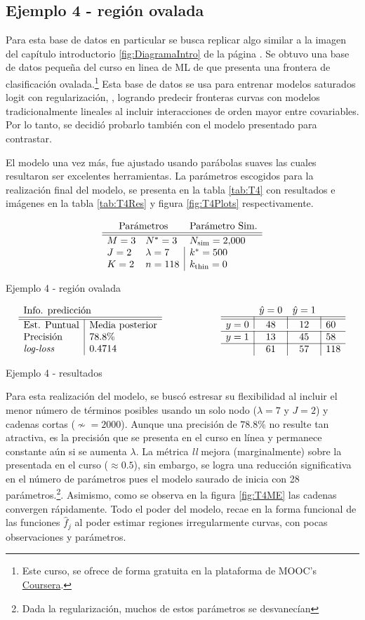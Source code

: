 \documentclass[../Main/Main.tex]{subfiles}
\begin{document}
\subsection*{Ejemplo 4 - región ovalada}
Para esta base de datos en particular se busca replicar algo similar a la imagen del capítulo introductorio \ref{fig:DiagramaIntro} de la página \pageref{fig:DiagramaIntro}. Se obtuvo una base de datos pequeña del curso en linea de ML de \citet{andrew2018ml} que presenta una frontera de clasificación ovalada.\footnote{Este curso, se ofrece de forma gratuita en la plataforma de MOOC's \href{https://www.coursera.org/learn/machine-learning}{Coursera}.} Esta base de datos se usa para entrenar modelos saturados logit con regularización, \citet{hastie2008elements}, logrando predecir fronteras curvas con modelos tradicionalmente lineales al incluir interacciones de orden mayor entre covariables. Por lo tanto, se decidió probarlo también con el modelo presentado para contrastar.

El modelo una vez más, fue ajustado usando parábolas suaves las cuales resultaron ser excelentes herramientas. La parámetros escogidos para la realización final del modelo, se presenta en la tabla \ref{tab:T4} con resultados e imágenes en la tabla \ref{tab:T4Res} y figura \ref{fig:T4Plots} respectivamente.  
\begin{table}[h]
$$\paramsmod{3}{2}{2}{3}{7}{118}{\num{2000}}{500}{0}$$
\caption{Ejemplo 4 - región ovalada}
\label{tab:T4}
\end{table}

\begin{table}[h]
\begin{align*}
\resultados{\text{Media posterior}}{78.8}{0.4714}
\qquad\qquad\qquad
\matconf{48}{12}{60}{13}{45}{58}{61}{57}{118}
\end{align*}
\caption{Ejemplo 4 - resultados}
\label{tab:Test4Ej9Res}
\end{table}

Para esta realización del modelo, se buscó estresar su flexibilidad al incluir el menor número de términos posibles usando un solo nodo ($\lambda = 7$ y $J = 2$) y cadenas cortas ($\nsim = \num{2000}$). Aunque una precisión de $78.8\%$ no resulte tan atractiva, es la precisión que se presenta en el curso en línea y permanece constante aún si se aumenta $\lambda$. La métrica \textit{ll} mejora (marginalmente) sobre la presentada en el curso ($\approx0.5$), sin embargo, se logra una reducción significativa en el número de parámetros pues el modelo saurado de \citet{andrew2018ml} inicia con 28 parámetros.\footnote{Dada la regularización, muchos de estos parámetros se desvanecían}. Asimismo, como se observa en la figura \ref{fig:T4ME} las cadenas convergen rápidamente. Todo el poder del modelo, recae en la forma funcional de las funciones $\hat{f}_j$ al poder estimar regiones irregularmente curvas, con pocas observaciones y parámetros. 
\end{document}
